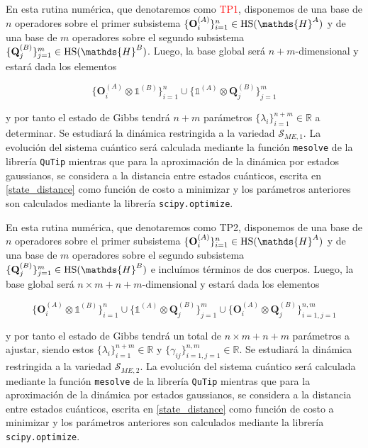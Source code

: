 \documentclass{report} %
\numberwithin{equation}{section}
\begin{document}
    \begin{tcolorbox}[title= Proyección Ortogonal de un cuerpo]
     En esta rutina numérica, que denotaremos como \textcolor{red}{TP1}, disponemos de una base de $n$ operadores sobre el primer subsistema $\{\mathbf{O}_i^{(A)}\}_{i=1}^{n}\in\textnormal{HS}(\mathds{H}^{A})$ y de una base de $m$ operadores sobre el segundo subsistema $\{\mathbf{Q}_j^{(B)}\}_{j=1}^{m} \in \textnormal{HS}(\mathds{H}^{B})$. Luego, la base global será $n+m$-dimensional y estará dada los elementos
    
    $$
    \{\mathbf{O}_i^{(A)} \otimes \mathds{1}^{(B)}\}_{i=1}^{n} \cup \{\mathds{1}^{(A)} \otimes \mathbf{Q}_j^{(B)}\}_{j=1}^{m}
    $$
    
    y por tanto el estado de Gibbs tendrá $n+m$ parámetros $\{\lambda_{i}\}_{i=1}^{n+m} \in \mathds{R}$ a determinar. Se estudiará la dinámica restringida a la variedad $\mathcal{S}_{ME,1}$. La evolución del sistema cuántico será calculada mediante la función \texttt{mesolve} de la librería \texttt{QuTip} mientras que para la aproximación de la dinámica por estados gaussianos, se considera a la distancia entre estados cuánticos, escrita en \eqref{state_distance} como función de costo a minimizar y los parámetros anteriores son calculados mediante la librería \texttt{scipy.optimize}.
     \end{tcolorbox}
    \begin{tcolorbox}[title= Proyección Ortogonal de dos cuerpos]
    En esta rutina numérica, que denotaremos como \textcolor{dark green}{TP2}, disponemos de una base de $n$ operadores sobre el primer subsistema $\{\mathbf{O}_i^{(A)}\}_{i=1}^{n}\in \textnormal{HS}(\mathds{H}^{A})$ y de una base de $m$ operadores sobre el segundo subsistema $\{\mathbf{Q}_j^{(B)}\}_{j=1}^{m} \in \textnormal{HS}(\mathds{H}^{B})$ e incluímos términos de dos cuerpos. Luego, la base global será $n\times m+n+m$-dimensional y estará dada los elementos
    
    $$
    \{\mathbf{O}_i^{(A)} \otimes \mathds{1}^{(B)}\}_{i=1}^{n} \cup \{\mathds{1}^{(A)} \otimes \mathbf{Q}_j^{(B)}\}_{j=1}^{m} \cup \{\mathbf{O}_i^{(A)} \otimes \mathbf{Q}_j^{(B)}\}_{i=1, j=1}^{n,m}
    $$
    
    y por tanto el estado de Gibbs tendrá un total de $n \times m + n + m$ parámetros a ajustar, siendo estos $\{\lambda_{i}\}_{i=1}^{n+m} \in \mathds{R}$ y $\{\gamma_{ij}\}_{i=1,j=1}^{n,m} \in \mathds{R}$. Se estudiará la dinámica restringida a la variedad $\mathcal{S}_{ME,2}$. La evolución del sistema cuántico será calculada mediante la función \texttt{mesolve} de la librería \texttt{QuTip} mientras que para la aproximación de la dinámica por estados gaussianos, se considera a la distancia entre estados cuánticos, escrita en \eqref{state_distance} como función de costo a minimizar y los parámetros anteriores son calculados mediante la librería \texttt{scipy.optimize}.
     \end{tcolorbox}
\end{document}
